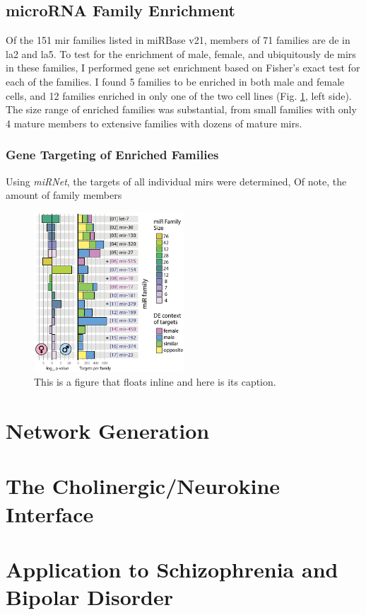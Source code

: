 \subsection{microRNA Family Enrichment}
Of the 151 \ac{mir} families listed in miRBase v21, members of 71 families are \ac{de} in \ac{la2} and \ac{la5}. To test for the enrichment of male, female, and ubiquitously \ac{de} \acp{mir} in these families, I performed gene set enrichment based on Fisher's exact test for each of the families. I found 5 families to be enriched in both male and female cells, and 12 families enriched in only one of the two cell lines (Fig. \ref{fig:mir-de-fam}, left side). The size range of enriched families was substantial, from small families with only 4 mature members to extensive families with dozens of mature \acp{mir}. 

\subsubsection{Gene Targeting of Enriched Families}
Using \textit{miRNet}, the targets of all individual \acp{mir} were determined, Of note, the amount of family members

\begin{figure}
\includegraphics[width=0.5\textwidth]{figures/mir-de-fam}
\caption[Short figure name.]{This is a figure that floats inline and here is its caption.
\label{fig:mir-de-fam}}
\end{figure}


\section{Network Generation}

\section{The Cholinergic/Neurokine Interface}

\section{Application to Schizophrenia and Bipolar Disorder}
